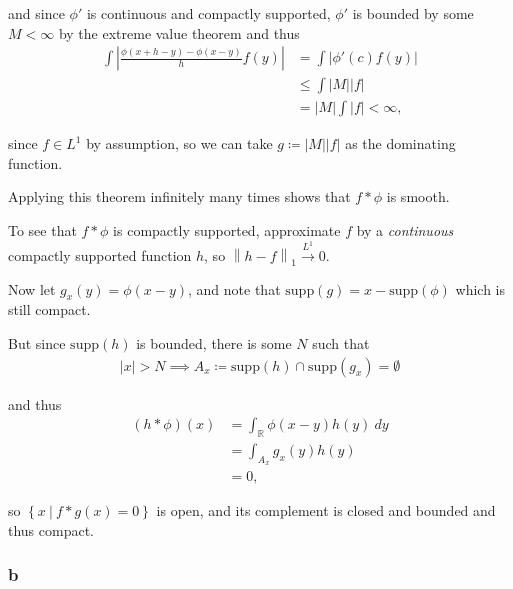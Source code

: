 \begin{solution}
and since \(\phi'\) is continuous and compactly supported, \(\phi'\) is
bounded by some \(M < \infty\) by the extreme value theorem and thus
\begin{align*}
\int {\left\lvert {\frac{\phi(x + h - y) - \phi(x - y)}{h} f(y)} \right\rvert} 
&= \int {\left\lvert {\phi'(c) f(y)} \right\rvert} \\
&\leq \int {\left\lvert {M} \right\rvert}{\left\lvert {f} \right\rvert} \\
&= {\left\lvert {M} \right\rvert} \int {\left\lvert {f} \right\rvert} < \infty
,\end{align*}

since \(f\in L^1\) by assumption, so we can take
\(g\coloneqq{\left\lvert {M} \right\rvert} {\left\lvert {f} \right\rvert}\)
as the dominating function.

Applying this theorem infinitely many times shows that \(f\ast \phi\) is
smooth.

To see that \(f\ast \phi\) is compactly supported, approximate \(f\) by
a \emph{continuous} compactly supported function \(h\), so
\({\left\lVert {h - f} \right\rVert}_1 \overset{L^1}\to 0\).

Now let \(g_x(y) = \phi(x-y)\), and note that
\(\mathrm{supp}(g) = x - \mathrm{supp}(\phi)\) which is still compact.

But since \(\mathrm{supp}(h)\) is bounded, there is some \(N\) such that
\begin{align*}
{\left\lvert {x} \right\rvert} > N \implies A_x\coloneqq\mathrm{supp}(h) \cap\mathrm{supp}(g_x) = \emptyset
\end{align*}

and thus
\begin{align*}
(h\ast \phi)(x) 
&= \int_{\mathbb{R}}\phi(x-y) h(y)~dy \\
&= \int_{A_x} g_x(y) h(y) \\
&= 0
,\end{align*}

so \(\left\{{x {~\mathrel{\Big|}~}f\ast g(x) = 0}\right\}\) is open, and
its complement is closed and bounded and thus compact.

\hypertarget{b-12}{%
\subsubsection{b}\label{b-12}}


\end{solution}
